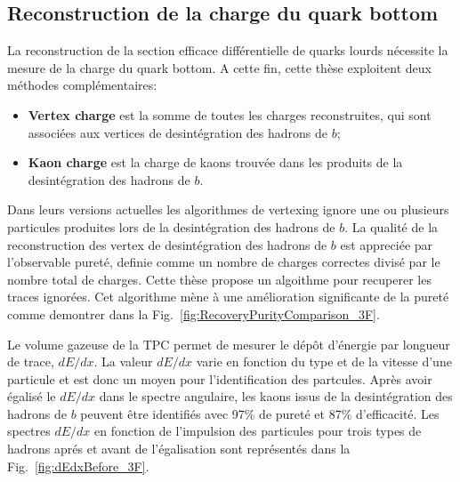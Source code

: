 \subsection*{Reconstruction de la charge du quark bottom}
La reconstruction de la section efficace différentielle de quarks lourds nécessite la mesure de la charge du quark bottom.
A cette fin, cette thèse exploitent deux méthodes complémentaires:
\begin{itemize}
	\item \textbf{Vertex charge} est la somme de toutes les charges reconstruites, qui sont associées aux vertices de desintégration des hadrons de $b$;
	\item \textbf{Kaon charge} est la charge de kaons trouvée dans les produits de la desintégration des hadrons de $b$. 
\end{itemize}

Dans leurs versions actuelles les algorithmes de vertexing ignore une ou plusieurs particules produites lors de la desintégration des hadrons de $b$. La qualité de la reconstruction des vertex de desintégration des hadrons de $b$ est appreciée par l'observable pureté, definie comme un nombre de charges correctes divis\'e par le nombre total de charges.
Cette thèse propose un algoithme pour recuperer les traces ignorées. Cet algorithme mène à une amélioration significante de la pureté comme demontrer dans la Fig.~\ref{fig:RecoveryPurityComparison_3F}.%

Le volume gazeuse de la TPC permet de mesurer le dépôt d'énergie par longueur de trace, $dE/dx$. La valeur  $dE/dx$ varie en fonction du type et de la vitesse d'une particule et est donc un moyen pour l'identification des partcules.   Après avoir égalisé le $dE/dx$ dans le spectre angulaire, les kaons issus de la desintégration des hadrons de $b$ peuvent être identifiés avec 97\% de pureté et 87\% d'efficacité.
Les spectres $dE/dx$ en fonction de l'impulsion des particules pour trois types de hadrons apr\'es et avant de l'égalisation sont représentés dans la Fig.~\ref{fig:dEdxBefore_3F}.

